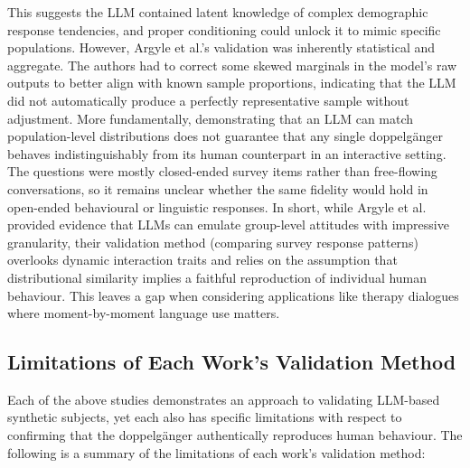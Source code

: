 This suggests the LLM contained latent knowledge of complex demographic response tendencies, and proper conditioning could unlock it to mimic specific populations. However, Argyle et al.’s validation was inherently statistical and aggregate. The authors had to correct some skewed marginals in the model’s raw outputs to better align with known sample proportions, indicating that the LLM did not automatically produce a perfectly representative sample without adjustment. More fundamentally, demonstrating that an LLM can match population-level distributions does not guarantee that any single doppelgänger behaves indistinguishably from its human counterpart in an interactive setting. The questions were mostly closed-ended survey items rather than free-flowing conversations, so it remains unclear whether the same fidelity would hold in open-ended behavioural or linguistic responses. In short, while Argyle et al. provided evidence that LLMs can emulate group-level attitudes with impressive granularity, their validation method (comparing survey response patterns) overlooks dynamic interaction traits and relies on the assumption that distributional similarity implies a faithful reproduction of individual human behaviour. This leaves a gap when considering applications like therapy dialogues where moment-by-moment language use matters.



\subsection{Limitations of Each Work's Validation Method}

Each of the above studies demonstrates an approach to validating LLM-based synthetic subjects, yet each also has specific limitations with respect to confirming that the doppelgänger authentically reproduces human behaviour. The following is a summary of the limitations of each work's validation method:

